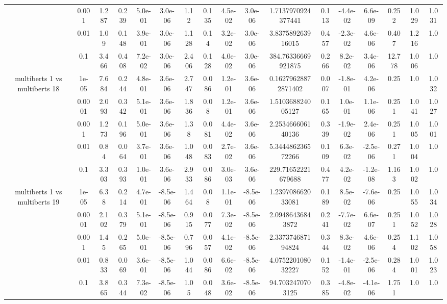 \begin{tabular}{|c|c|c|c|c|c|c|c|c|c|c|c|c|c|c|c|c|}
 & 0.001 & 1.287 & 0.239 & 5.0e-01 & 3.0e-06 & 1.12 & 0.135 & 4.5e-02 & 3.0e-06 & 1.7137970924377441 & 0.113 & -4.4e-02 & 6.6e-09 & 0.252 & 1.029 & 1.031 \\
 & 0.01 & 1.09 & 0.148 & 3.9e-01 & 3.0e-06 & 1.128 & 0.14 & 3.2e-02 & 3.0e-06 & 3.837589263916015 & 0.457 & -2.3e-02 & 4.6e-06 & 0.407 & 1.216 & 1.0 \\
 & 0.1 & 3.466 & 0.408 & 7.2e-02 & 3.0e-06 & 2.406 & 0.128 & 4.0e-02 & 3.0e-06 & 384.76336669921875 & 0.266 & 8.2e-02 & 3.4e-06 & 12.778 & 1.006 & 1.0 \\
\hline
\multirow{5}{*}{multiberts 1 vs multiberts 18} & 1e-05 & 7.684 & 0.244 & 4.8e-01 & 3.6e-06 & 2.747 & 0.086 & 1.2e-01 & 3.6e-06 & 0.16279628872871402 & 0.007 & -1.8e-01 & 4.2e-06 & 0.25 & 1.0 & 1.032 \\
 & 0.0001 & 2.093 & 0.342 & 5.1e-01 & 3.6e-06 & 1.836 & 0.08 & 1.2e-01 & 3.6e-06 & 1.510368824005127 & 0.165 & 1.0e-01 & 1.1e-06 & 0.251 & 1.041 & 1.027 \\
 & 0.001 & 1.273 & 0.196 & 5.0e-01 & 3.6e-06 & 1.38 & 0.081 & 4.4e-02 & 3.6e-06 & 2.253466606140136 & 0.339 & -1.9e-02 & 2.4e-06 & 0.251 & 1.005 & 1.001 \\
 & 0.01 & 0.84 & 0.064 & 3.7e-01 & 3.6e-06 & 1.048 & 0.083 & 2.7e-02 & 3.6e-06 & 5.344486236572266 & 0.109 & 6.3e-02 & -2.5e-06 & 0.271 & 1.004 & 1.0 \\
 & 0.1 & 3.303 & 0.393 & 1.0e-01 & 3.6e-06 & 2.933 & 0.086 & 3.0e-03 & 3.6e-06 & 229.71652221679688 & 0.477 & 4.2e-02 & -1.2e-08 & 1.163 & 1.002 & 1.0 \\
\hline
\multirow{5}{*}{multiberts 1 vs multiberts 19} & 1e-05 & 6.38 & 0.214 & 4.7e-01 & -8.5e-06 & 1.464 & 0.08 & 1.1e-01 & -8.5e-06 & 1.239708662033081 & 0.189 & 8.5e-02 & -7.6e-06 & 0.25 & 1.055 & 1.034 \\
 & 0.0001 & 2.102 & 0.379 & 5.1e-01 & -8.5e-06 & 0.915 & 0.077 & 7.3e-02 & -8.5e-06 & 2.09486436843872 & 0.241 & -7.7e-02 & 6.6e-07 & 0.251 & 1.052 & 1.028 \\
 & 0.001 & 1.45 & 0.265 & 5.0e-01 & -8.5e-06 & 0.796 & 0.057 & 4.1e-02 & -8.5e-06 & 2.337374687194824 & 0.344 & 8.3e-02 & 4.6e-06 & 0.254 & 1.102 & 1.058 \\
 & 0.01 & 0.833 & 0.069 & 3.6e-01 & -8.5e-06 & 1.044 & 0.086 & 6.6e-02 & -8.5e-06 & 4.075220108032227 & 0.152 & -1.4e-01 & -2.5e-06 & 0.284 & 1.001 & 1.023 \\
 & 0.1 & 3.865 & 0.344 & 7.3e-02 & -8.5e-06 & 1.05 & 0.048 & 3.6e-02 & -8.5e-06 & 94.7032470703125 & 0.385 & -4.8e-02 & -4.1e-06 & 1.751 & 1.0 & 1.0 \\

\end{tabular}
